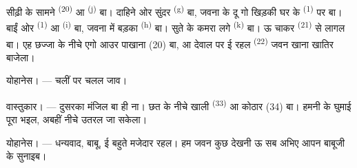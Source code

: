सीढ़ी के सामने  \textsuperscript{(20)} आ
 \textsuperscript{(j)} बा। दाहिने ओर सुंदर
 \textsuperscript{(g)} बा, जवना के दू गो खिड़की घर
के  \textsuperscript{(1)} पर बा। बाईं ओर  \textsuperscript{(1)} आ  \textsuperscript{(i)}
बा, जवना में बड़का  \textsuperscript{(h)} बा। सुते के कमरा
लगे  \textsuperscript{(k)} बा। ऊ चाकर
 \textsuperscript{(21)} से लागल बा। एह छज्जा के नीचे एगो
आउर पाखाना (20) बा, आ देवाल पर ई रहल  \textsuperscript{(22)}
जवन खाना खातिर बाजेला।

\textsc{योहानेस}। --- चलीं  पर चलल जाव।

\textsc{वास्तुकार}। --- दुसरका मंजिल बा ही ना। छत के नीचे खाली
 \textsuperscript{(33)} आ कोठार (34) बा। हमनी के घुमाई
पूरा भइल, अबहीं नीचे उतरल जा सकेला।

\textsc{योहानेस}। --- धन्यवाद, बाबू, ई बहुते मजेदार रहल। हम जवन कुछ
देखनी ऊ सब अभिए आपन बाबूजी के सुनाइब।

